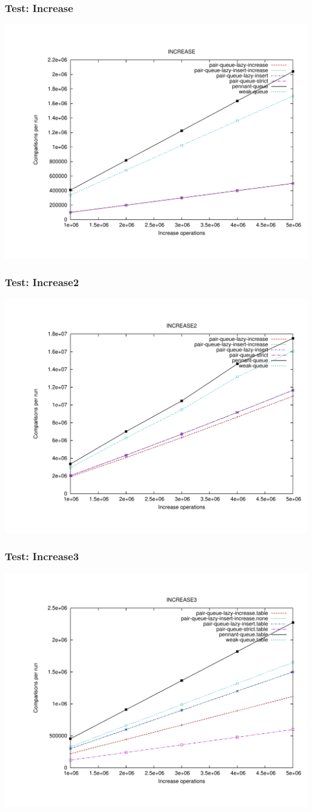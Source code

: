 \documentclass{beamer}
\begin{document}
\begin{frame}
\frametitle{Test: Increase}
\includegraphics[width=.85\textwidth]{../graphs/increase.pdf}
\end{frame}
\begin{frame}
\frametitle{Test: Increase2}
\includegraphics[width=.85\textwidth]{../graphs/increase2.pdf}
\end{frame}
\begin{frame}
\frametitle{Test: Increase3}
\includegraphics[width=.85\textwidth]{../graphs/increase3.pdf}
\end{frame}
\end{document}
